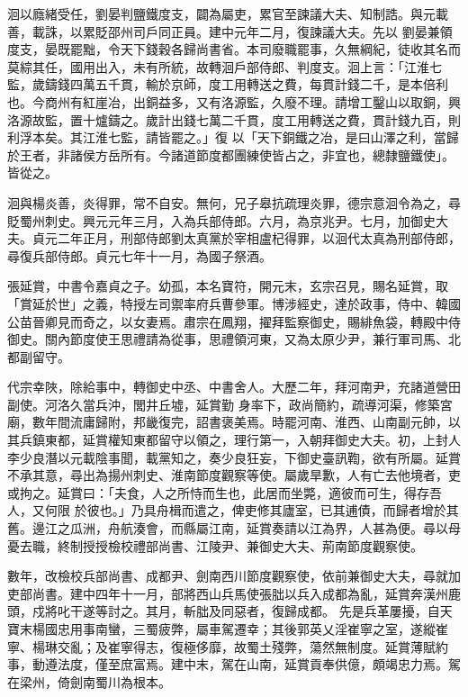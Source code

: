 \begin{pinyinscope}
 洄以廕緒受任，劉晏判鹽鐵度支，闢為屬吏，累官至諫議大夫、知制誥。與元載善，載誅，以累貶邵州司戶同正員。建中元年二月，復諫議大夫。先以
 劉晏兼領度支，晏既罷黜，令天下錢穀各歸尚書省。本司廢職罷事，久無綱紀，徒收其名而莫綜其任，國用出入，未有所統，故轉洄戶部侍郎、判度支。洄上言：「江淮七監，歲鑄錢四萬五千貫，輸於京師，度工用轉送之費，每貫計錢二千，是本倍利也。今商州有紅崖冶，出銅益多，又有洛源監，久廢不理。請增工鑿山以取銅，興洛源故監，置十爐鑄之。歲計出錢七萬二千貫，度工用轉送之費，貫計錢九百，則利浮本矣。其江淮七監，請皆罷之。」復
 以「天下銅鐵之冶，是曰山澤之利，當歸於王者，非諸侯方岳所有。今諸道節度都團練使皆占之，非宜也，總隸鹽鐵使」。皆從之。



 洄與楊炎善，炎得罪，常不自安。無何，兄子皋抗疏理炎罪，德宗意洄令為之，尋貶蜀州刺史。興元元年三月，入為兵部侍郎。六月，為京兆尹。七月，加御史大夫。貞元二年正月，刑部侍郎劉太真黨於宰相盧杞得罪，以洄代太真為刑部侍郎，尋復兵部侍郎。貞元七年十一月，為國子祭酒。



 張延賞，中書令嘉貞之子。幼孤，本名寶符，開元末，玄宗召見，賜名延賞，取「賞延於世」之義，特授左司禦率府兵曹參軍。博涉經史，達於政事，侍中、韓國公苗晉卿見而奇之，以女妻焉。肅宗在鳳翔，擢拜監察御史，賜緋魚袋，轉殿中侍御史。關內節度使王思禮請為從事，思禮領河東，又為太原少尹，兼行軍司馬、北都副留守。



 代宗幸陜，除給事中，轉御史中丞、中書舍人。大歷二年，拜河南尹，充諸道營田副使。河洛久當兵沖，閭井丘墟，延賞勤
 身率下，政尚簡約，疏導河渠，修築宮廟，數年間流庸歸附，邦畿復完，詔書褒美焉。時罷河南、淮西、山南副元帥，以其兵鎮東都，延賞權知東都留守以領之，理行第一，入朝拜御史大夫。初，上封人李少良潛以元載陰事聞，載黨知之，奏少良狂妄，下御史臺訊鞫，欲有所屬。延賞不承其意，尋出為揚州刺史、淮南節度觀察等使。屬歲旱歉，人有亡去他境者，吏或拘之。延賞曰：「夫食，人之所恃而生也，此居而坐斃，適彼而可生，得存吾人，又何限
 於彼也。」乃具舟楫而遣之，俾吏修其廬室，已其逋債，而歸者增於其舊。邊江之瓜洲，舟航湊會，而縣屬江南，延賞奏請以江為界，人甚為便。尋以母憂去職，終制授授檢校禮部尚書、江陵尹、兼御史大夫、荊南節度觀察使。



 數年，改檢校兵部尚書、成都尹、劍南西川節度觀察使，依前兼御史大夫，尋就加吏部尚書。建中四年十一月，部將西山兵馬使張朏以兵入成都為亂，延賞奔漢州鹿頭，戍將叱干遂等討之。其月，斬朏及同惡者，復歸成都。
 先是兵革屢擾，自天寶末楊國忠用事南蠻，三蜀疲弊，屬車駕遷幸；其後郭英乂淫崔寧之室，遂縱崔寧、楊琳交亂；及崔寧得志，復極侈靡，故蜀土殘弊，蕩然無制度。延賞薄賦約事，動遵法度，僅至庶富焉。建中末，駕在山南，延賞貢奉供億，頗竭忠力焉。駕在梁州，倚劍南蜀川為根本。




\end{pinyinscope}
